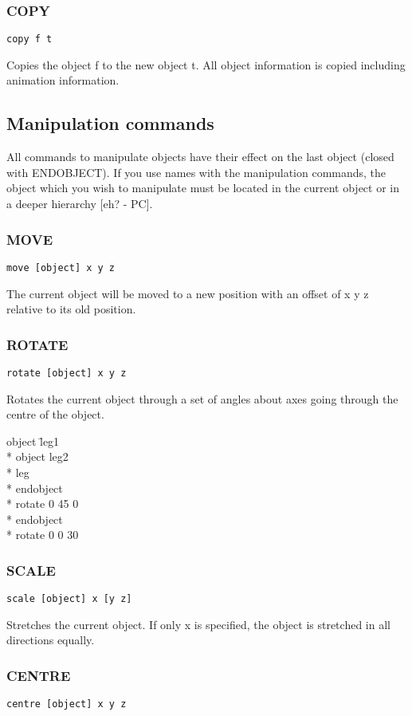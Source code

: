 \subsubsection{COPY}
\tt{copy f t}

Copies the object f to the new object t. All object information is copied
including animation information.

\subsection{Manipulation commands}
All commands to manipulate objects have their effect on the last object
(closed with ENDOBJECT). If you use names with the manipulation commands, the
object which you wish to manipulate must be located in the current object
or in a deeper hierarchy [eh? - PC].

\subsubsection{MOVE}
\tt{move [object] x y z}

The current object will be moved to a new position with an offset of x y z
relative to its old position.

\subsubsection{ROTATE}
\tt{rotate [object] x y z}

Rotates the current object through a set of angles about axes going through
the centre of the object.
\tt{
\begin{tabbing}
object \=leg1\\*
\>object leg2\\*
\>leg\\*
\>endobject\\*
\>rotate 0 45 0\\*	
endobject\\*
\>rotate 0 0 30	
\end{tabbing}
}

\subsubsection{SCALE}
\tt{scale [object] x [y z]}

Stretches the current object. If only x is specified, the object is stretched
in all directions equally.

\subsubsection{CENTRE}
\tt{centre [object] x y z}

